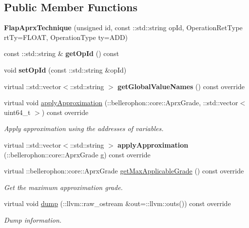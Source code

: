 \subsection*{Public Member Functions}
\begin{DoxyCompactItemize}
\item 
\hypertarget{classFlapAprxTechnique_aaf857d5880ae4252d4a2be9190728dde}{}\label{classFlapAprxTechnique_aaf857d5880ae4252d4a2be9190728dde} 
{\bfseries Flap\+Aprx\+Technique} (unsigned id, const \+::std\+::string op\+Id, Operation\+Ret\+Type rt\+Ty=F\+L\+O\+AT, Operation\+Type ty=A\+DD)
\item 
\hypertarget{classFlapAprxTechnique_aa5e7f37d6fd6559dcdae936173ecf7c0}{}\label{classFlapAprxTechnique_aa5e7f37d6fd6559dcdae936173ecf7c0} 
const \+::std\+::string \& {\bfseries get\+Op\+Id} () const
\item 
\hypertarget{classFlapAprxTechnique_a20a155653edc2ecb15a286ad20ad643c}{}\label{classFlapAprxTechnique_a20a155653edc2ecb15a286ad20ad643c} 
void {\bfseries set\+Op\+Id} (const \+::std\+::string \&op\+Id)
\item 
\hypertarget{classFlapAprxTechnique_a136c31fac2f58cd89a9fd9d4dbece992}{}\label{classFlapAprxTechnique_a136c31fac2f58cd89a9fd9d4dbece992} 
virtual \+::std\+::vector$<$\+::std\+::string $>$ {\bfseries get\+Global\+Value\+Names} () const override
\item 
\hypertarget{classFlapAprxTechnique_aefd2a4ab8d6ed9c92b34ff7860349590}{}\label{classFlapAprxTechnique_aefd2a4ab8d6ed9c92b34ff7860349590} 
virtual void \hyperlink{classFlapAprxTechnique_aefd2a4ab8d6ed9c92b34ff7860349590}{apply\+Approximation} (\+::bellerophon\+::core\+::\+Aprx\+Grade, \+::std\+::vector$<$ uint64\+\_\+t $>$) const override
\begin{DoxyCompactList}\small\item\em Apply approximation using the addresses of variables. \end{DoxyCompactList}\item 
\hypertarget{classFlapAprxTechnique_a93c20ee12acf2d5f12960706c12000ab}{}\label{classFlapAprxTechnique_a93c20ee12acf2d5f12960706c12000ab} 
virtual \+::std\+::vector$<$\+::std\+::string $>$ {\bfseries apply\+Approximation} (\+::bellerophon\+::core\+::\+Aprx\+Grade g) const override
\item 
virtual \+::bellerophon\+::core\+::\+Aprx\+Grade \hyperlink{classFlapAprxTechnique_af35c36c904e8c077c3fdf6bd35f5192c}{get\+Max\+Applicable\+Grade} () const override
\begin{DoxyCompactList}\small\item\em Get the maximum approximation grade. \end{DoxyCompactList}\item 
\hypertarget{classFlapAprxTechnique_a2d3dc7d3c0c44f6d49d51d2e460d298d}{}\label{classFlapAprxTechnique_a2d3dc7d3c0c44f6d49d51d2e460d298d} 
virtual void \hyperlink{classFlapAprxTechnique_a2d3dc7d3c0c44f6d49d51d2e460d298d}{dump} (\+::llvm\+::raw\+\_\+ostream \&out=\+::llvm\+::outs()) const override
\begin{DoxyCompactList}\small\item\em Dump information. \end{DoxyCompactList}\end{DoxyCompactItemize}
